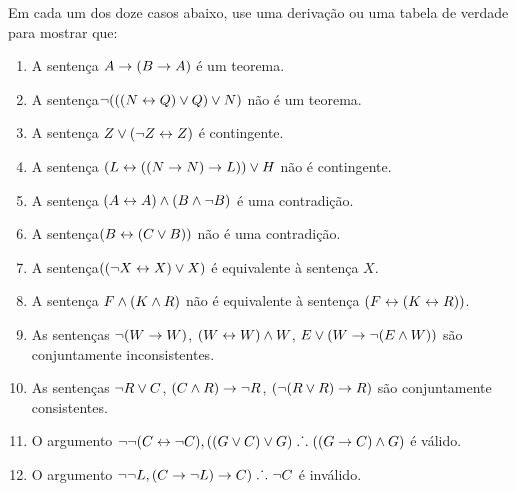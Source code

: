 \noindent\problempart Em cada um dos doze casos abaixo, use uma  derivação ou uma tabela de verdade para mostrar que:
\begin{enumerate}%
\item A sentença $A \rightarrow (B \rightarrow A)$ é um teorema.
\item A sentença$\neg (((N \leftrightarrow Q) \vee Q) \vee N)$ não é um teorema.
\item A sentença $ Z \vee (\neg Z \leftrightarrow Z) $ é contingente.
\item A sentença $ (L \leftrightarrow ((N \rightarrow N) \rightarrow L)) \vee H $ não é contingente.
\item A sentença $ (A \leftrightarrow A) \wedge (B \wedge \neg B)$ é uma contradição.
\item A sentença$ (B \leftrightarrow (C \vee B)) $ não é uma contradição. 
\item A sentença$ ((\neg X \leftrightarrow X) \vee X) $  é equivalente à sentença $X$.
\item A sentença $F \wedge (K \wedge R) $ não  é equivalente à sentença $ (F \leftrightarrow (K \leftrightarrow R)) $.
\item As sentenças $ \neg (W \rightarrow W)$, $(W \leftrightarrow W) \wedge W$, $E \vee (W \rightarrow \neg (E \wedge W))$ são conjuntamente inconsistentes. 

\item As sentenças  $\neg R \vee C $, $(C \wedge R) \rightarrow \neg R$, $(\neg (R \vee R) \rightarrow R) $ são conjuntamente consistentes.
\item O argumento $\neg \neg (C \leftrightarrow \neg C), ((G \vee C) \vee G) \mathrel{\ldotp\dot{}\,\ldotp} ((G \rightarrow C) \wedge G) $ é válido.
\item O argumento $ \neg \neg L,  (C \rightarrow \neg L) \rightarrow C) \mathrel{\ldotp\dot{}\,\ldotp} \neg C$  é  inválido.
\end{enumerate}

